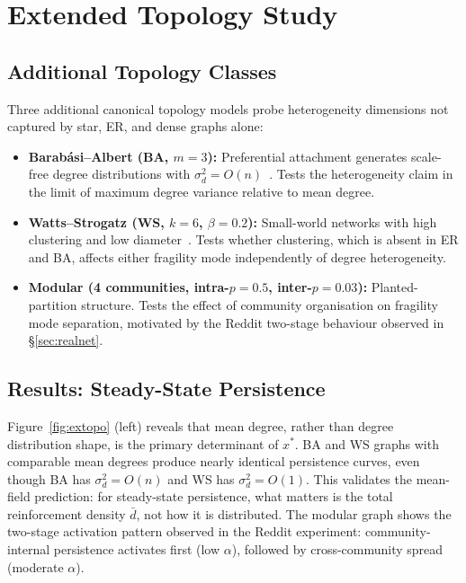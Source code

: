 \documentclass[10pt,twocolumn]{article}
\theoremstyle{myproof}
\newcommand{\xst}{x^*}
\begin{document}
\section{Extended Topology Study}
\label{sec:topo}

\subsection{Additional Topology Classes}
Three additional canonical topology models probe heterogeneity dimensions not captured by star,
ER, and dense graphs alone:
\begin{itemize}
  \item \textbf{Barab\'{a}si--Albert (BA, $m=3$):} Preferential attachment generates scale-free
        degree distributions with $\sigma^2_d=O(n)$~\cite{barabasi1999}. Tests the
        heterogeneity claim in the limit of maximum degree variance relative to mean degree.
  \item \textbf{Watts--Strogatz (WS, $k=6$, $\beta=0.2$):} Small-world networks with high
        clustering and low diameter~\cite{watts2002}. Tests whether clustering, which is absent in ER
        and BA, affects either fragility mode independently of degree heterogeneity.
  \item \textbf{Modular (4 communities, intra-$p=0.5$, inter-$p=0.03$):} Planted-partition
        structure. Tests the effect of community organisation on fragility mode separation,
        motivated by the Reddit two-stage behaviour observed in \S\ref{sec:realnet}.
\end{itemize}

\subsection{Results: Steady-State Persistence}
Figure~\ref{fig:extopo} (left) reveals that mean degree, rather than degree distribution shape, is the
primary determinant of $\xst$. BA and WS graphs with comparable mean degrees produce nearly
identical persistence curves, even though BA has $\sigma^2_d=O(n)$ and WS has $\sigma^2_d=O(1)$.
This validates the mean-field prediction: for steady-state persistence, what matters is the total
reinforcement density $\bar{d}$, not how it is distributed. The modular graph shows the two-stage
activation pattern observed in the Reddit experiment: community-internal persistence activates
first (low $\alpha$), followed by cross-community spread (moderate $\alpha$).
\end{document}
